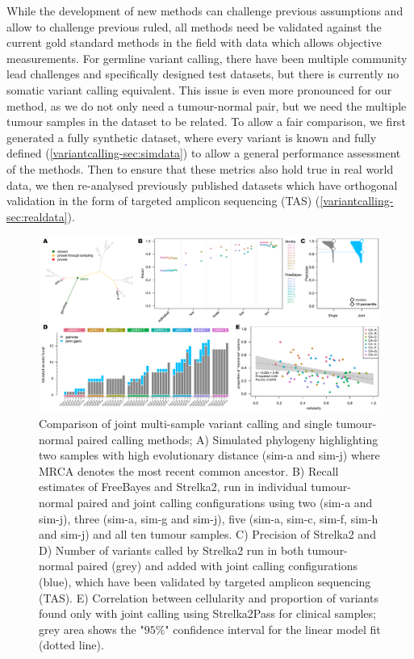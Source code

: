While the development of new methods can challenge previous assumptions and allow to challenge previous ruled, all methods need be validated against the current gold standard methods in the field with data which allows objective measurements. For germline variant calling, there have been multiple community lead challenges and specifically designed test datasets, but there is currently no somatic variant calling equivalent. This issue is even more pronounced for our method, as we do not only need a tumour-normal pair, but we need the multiple tumour samples in the dataset to be related. To allow a fair comparison, we first generated a fully synthetic dataset, where every variant is known and fully defined (\autoref{variantcalling-sec:simdata}) to allow a general performance assessment of the methods. Then to ensure that these metrics also hold true in real world data, we then re-analysed previously published datasets which have orthogonal validation in the form of targeted amplicon sequencing (TAS) (\autoref{variantcalling-sec:realdata}).

\begin{figure}[!tpb]
\centering
  \includegraphics[width=\textwidth]{Appendices/Variantcalling/Figure_1}\vspace*{-12pt}
  \caption[Comparison of joint multi-sample and single tumour-normal paired variant calling methods]{Comparison of joint multi-sample variant calling and single tumour-normal paired calling methods; A) Simulated phylogeny highlighting two samples with high evolutionary distance (sim-a and sim-j) where MRCA denotes the most recent common ancestor. B) Recall estimates of FreeBayes and Strelka2, run in individual tumour-normal paired and joint calling configurations using two (sim-a and sim-j), three (sim-a, sim-g and sim-j), five (sim-a, sim-c, sim-f, sim-h and sim-j) and all ten tumour samples. C) Precision of Strelka2 and D) Number of variants called by Strelka2 run in both tumour-normal paired (grey) and added with joint calling configurations (blue), which have been validated by targeted amplicon sequencing (TAS). E) Correlation between cellularity and proportion of variants found only with joint calling using Strelka2Pass for clinical samples; grey area shows the "$95\%$" confidence interval for the linear model fit (dotted line).}\label{fig:varcalling:fig1}
\end{figure}


